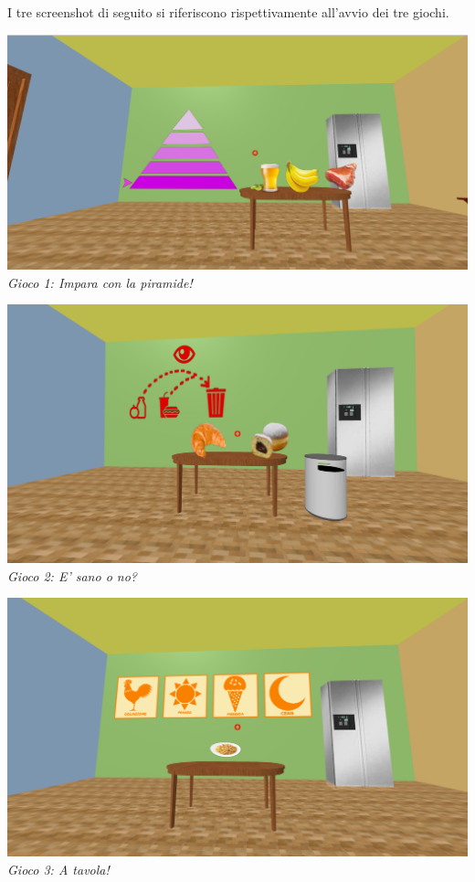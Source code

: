 I tre screenshot di seguito si riferiscono rispettivamente all'avvio dei tre giochi.
\begin{center}
\includegraphics[width=.70\textwidth]{Images/Design/pyramid}\\
\vspace{5px}
\emph{Gioco 1: Impara con la piramide!}\bigskip
\end{center}
\begin{center}
\includegraphics[width=.70\textwidth]{Images/Design/Healthy}\\
\vspace{5px}
\emph{Gioco 2: E' sano o no?}\bigskip
\end{center}
\begin{center}
\includegraphics[width=.70\textwidth]{Images/Design/Eat}\\
\vspace{5px}
\emph{Gioco 3: A tavola!}\bigskip
\end{center}
\clearpage

